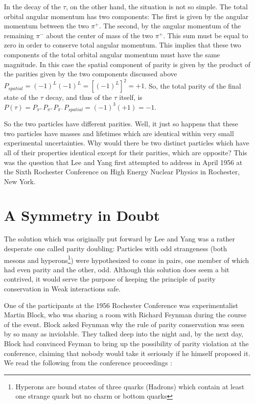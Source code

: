 \documentclass[12pt]{book}
\begin{document}
In the decay of the $\tau$, on the other hand, the situation is not so simple. The total orbital angular momentum has two components: The first is given by the angular momentum between the two $\pi^{+}$. The second, by the angular momentum of the remaining $\pi^{-}$ about the center of mass of the two $\pi^{+}$. This sum must be equal to zero in order to conserve total angular momentum. This implies that these two components of the total orbital angular momentum must have the same magnitude. In this case the spatial component of parity is given by the product of the parities given by the two components discussed above $P_{spatial}=(-1)^{L}(-1)^{L}=[(-1)^{L}]^{2}=+1$. So, the total parity of the final state of the $\tau$ decay, and thus of the $\tau$ itself, is $P(\tau)=P_{\pi^{+}}P_{\pi^{+}}P_{\pi^{-}}P_{spatial}=(-1)^{3}(+1)=-1$.\cite{morii}

So the two particles have different parities. Well, it just so happens that these two particles have masses and lifetimes which are identical within very small experimental uncertainties. Why would there be two distinct particles which have all of their properties identical except for their parities, which are opposite? This was the question that Lee and Yang first attempted to address in April 1956 at the Sixth Rochester Conference on High Energy Nuclear Physics in Rochester, New York.

\section{A Symmetry in Doubt}

\paragraph*{}The solution which was originally put forward by Lee and Yang was a rather desperate one called parity doubling: Particles with odd strangeness (both mesons and hyperons\footnote{Hyperons are bound states of three quarks (Hadrons) which contain at least one strange quark but no charm or bottom quarks}) were hypothesized to come in pairs, one member of which had even parity and the other, odd. Although this solution does seem a bit contrived, it would serve the purpose of keeping the principle of parity conservation in Weak interactions safe.

One of the participants at the 1956 Rochester Conference was experimentalist Martin Block, who was sharing a room with Richard Feynman during the course of the event. Block asked Feynman why the rule of parity conservation was seen by so many as inviolable. They talked deep into the night and, by the next day, Block had convinced Feyman to bring up the possibility of parity violation at the conference, claiming that nobody would take it seriously if he himself proposed it. We read the following from the conference proceedings \cite{brandt}\cite{ballam}:
\end{document}
